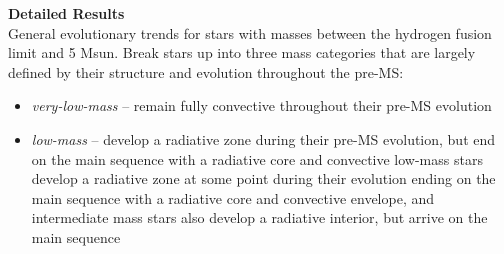 \textbf{Detailed Results} \\
General evolutionary trends for stars with masses between the hydrogen fusion limit and 5 Msun. Break stars up into three mass categories that are largely defined by their structure and evolution throughout the pre-MS: 
\begin{itemize}
 \item[] {\it very-low-mass} -- remain fully convective throughout their pre-MS evolution
 \item[] {\it low-mass} -- develop a radiative zone during their pre-MS evolution, but end on the main sequence with a radiative core and convective 
low-mass stars develop a radiative zone at some point during their evolution ending on the main sequence with a radiative core and convective envelope, and intermediate mass stars also develop a radiative interior, but arrive on the main sequence
\end{itemize}